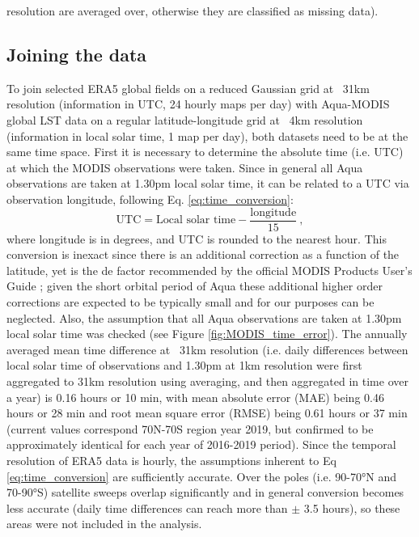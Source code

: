 \documentclass[hess, twostagejnl]{copernicus}
\begin{document}
resolution are averaged over, otherwise they are classified as missing data).




\subsection{Joining the data}\label{sec:join}
To join selected ERA5 global fields on a reduced Gaussian grid at ~31km resolution (information in UTC, 24 hourly maps per day) with Aqua-MODIS global LST data on a regular latitude-longitude grid at ~4km resolution (information in local solar time, 1 map per day), both datasets need to be at the same time space. First it is necessary to determine the absolute time (i.e. UTC) at which the MODIS observations were taken. Since in general all Aqua observations are taken at 1.30pm local solar time, it can be related to a UTC via observation longitude, following Eq. \ref{eq:time_conversion}:
\begin{equation}
	\text{UTC} = \text{Local solar time} - \frac{\text{longitude}}{15} \ , 
	\label{eq:time_conversion}
\end{equation}
where longitude is in degrees, and UTC is rounded to the nearest hour. This conversion is inexact since there is an additional correction as a function of the latitude, yet is the de factor recommended by the official MODIS Products User’s Guide \cite{MODISusersguide}; given the short orbital period of Aqua these additional higher order corrections are expected to be typically small and for our purposes can be neglected. Also, the assumption that all Aqua observations are taken at 1.30pm local solar time was checked (see Figure \ref{fig:MODIS_time_error}). The annually averaged mean time difference at ~31km resolution (i.e. daily differences between local solar time of observations and 1.30pm at 1km resolution were first aggregated to 31km resolution using averaging, and then aggregated in time over a year) is 0.16 hours or 10 min, with mean absolute error (MAE) being 0.46 hours or 28 min and root mean square error (RMSE) being 0.61 hours or 37 min (current values correspond 70N-70S region year 2019, but confirmed to be approximately identical for each year of 2016-2019 period). Since the temporal resolution of ERA5 data is hourly, the assumptions inherent to Eq \ref{eq:time_conversion} are sufficiently accurate. Over the poles (i.e. 90-70°N and 70-90°S) satellite sweeps overlap significantly and in general conversion becomes less accurate (daily time differences can reach more than $\pm$ 3.5 hours), so these areas were not included in the analysis. \newline 
\end{document}
